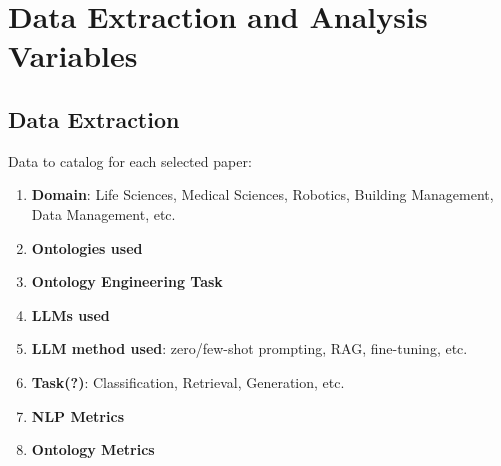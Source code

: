 \documentclass[a4paper,colorinlistoftodos]{article}
\begin{document}

\section{Data Extraction and Analysis Variables}
\label{sec:data-extraction-analysis-variables}

\subsection{Data Extraction}
\label{subsec:data-extraction}

Data to catalog for each selected paper:
\begin{enumerate}
  \item \textbf{Domain}: Life Sciences, Medical Sciences, Robotics, Building
    Management, Data Management, etc.
  \item \textbf{Ontologies used}
  \item \textbf{Ontology Engineering Task}
  \item \textbf{LLMs used}
  \item \textbf{LLM method used}: zero/few-shot prompting, RAG, fine-tuning, etc.
  \item \textbf{Task(?)}: Classification, Retrieval, Generation, etc.
  \item \textbf{NLP Metrics}
  \item \textbf{Ontology Metrics}
\end{enumerate}
\end{document}
